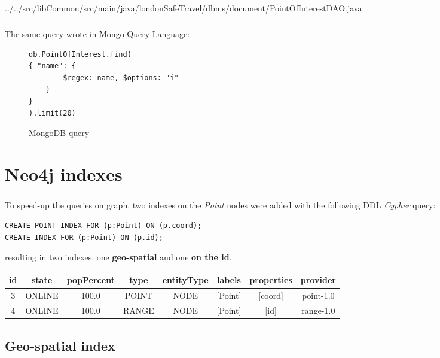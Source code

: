 
{../../src/libCommon/src/main/java/londonSafeTravel/dbms/document/PointOfInterestDAO.java}
\paragraph{}
The same query wrote in Mongo Query Language:
\begin{figure}[H]
	\begin{lstlisting}
db.PointOfInterest.find(
{ "name": {
		$regex: name, $options: "i"
	}
}
).limit(20)
	\end{lstlisting}
	\caption{MongoDB query}
\end{figure}


\chapter{Neo4j indexes}

\paragraph{}
To speed-up the queries on graph, two indexes on the \textit{Point} nodes were added with the following DDL \textit{Cypher} query:

\begin{lstlisting}
CREATE POINT INDEX FOR (p:Point) ON (p.coord);
CREATE INDEX FOR (p:Point) ON (p.id);
\end{lstlisting}

resulting in two indexes, one \textbf{geo-spatial} and one \textbf{on the id}.

\begin{tabular}{|c|c|c|c|c|c|c|c|}
	\hline
	
	id & state & popPercent & type & entityType & labels & properties & provider \\
	
	\hline
	\hline
	
	3 & ONLINE & 100.0 & POINT & NODE & [Point] & [coord] & point-1.0 \\
	
	\hline
	
	4 & ONLINE & 100.0 & RANGE & NODE & [Point] & [id] & range-1.0 \\
	
	\hline
\end{tabular}

\section{Geo-spatial index}
\label{geoindex}

